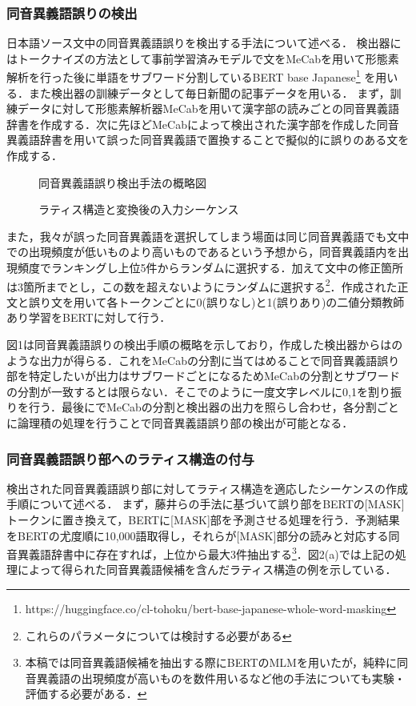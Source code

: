 \documentclass[a4j,10pt, twocolumn]{jarticle} \usepackage[dvipdfmx]{graphicx} \usepackage{amssymb} \usepackage{amsmath}
\begin{document}
\subsubsection{同音異義語誤りの検出}
日本語ソース文中の同音異義語誤りを検出する手法について述べる．
検出器にはトークナイズの方法として事前学習済みモデルで文をMeCabを用いて形態素解析を行った後に単語をサブワード分割しているBERT base Japanese\footnote{https://huggingface.co/cl-tohoku/bert-base-japanese-whole-word-masking}
を用いる．また検出器の訓練データとして毎日新聞の記事データを用いる．
まず，訓練データに対して形態素解析器MeCabを用いて漢字部の読みごとの同音異義語辞書を作成する．次に先ほどMeCabによって検出された漢字部を作成した同音異義語辞書を用いて誤った同音異義語で置換することで擬似的に誤りのある文を作成する．

\begin{figure}[h]
   \centering
    
    \caption{同音異義語誤り検出手法の概略図}
\end{figure}

\begin{figure}[h]
   \centering
    
    \caption{ラティス構造と変換後の入力シーケンス}
\end{figure}

また，我々が誤った同音異義語を選択してしまう場面は同じ同音異義語でも文中での出現頻度が低いものより高いものであるという予想から，同音異義語内を出現頻度でランキングし上位5件からランダムに選択する．加えて文中の修正箇所は3箇所までとし，この数を超えないようにランダムに選択する\footnote{これらのパラメータについては検討する必要がある}．作成された正文と誤り文を用いて各トークンごとに0(誤りなし)と1(誤りあり)の二値分類教師あり学習をBERTに対して行う．

図1は同音異義語誤りの検出手順の概略を示しており，作成した検出器からはのような出力が得らる．これをMeCabの分割に当てはめることで同音異義語誤り部を特定したいが出力はサブワードごとになるためMeCabの分割とサブワードの分割が一致するとは限らない．そこでのように一度文字レベルに0,1を割り振りを行う．最後にでMeCabの分割と検出器の出力を照らし合わせ，各分割ごとに論理積の処理を行うことで同音異義語誤り部の検出が可能となる．

\subsubsection{同音異義語誤り部へのラティス構造の付与}
検出された同音異義語誤り部に対してラティス構造を適応したシーケンスの作成手順について述べる．
まず，藤井ら\cite{Fujii}の手法に基づいて誤り部をBERTの[MASK]トークンに置き換えて，BERTに[MASK]部を予測させる処理を行う．予測結果をBERTの尤度順に10,000語取得し，それらが[MASK]部分の読みと対応する同音異義語辞書中に存在すれば，上位から最大3件抽出する\footnote{本稿では同音異義語候補を抽出する際にBERTのMLMを用いたが，純粋に同音異義語の出現頻度が高いものを数件用いるなど他の手法についても実験・評価する必要がある．}．図2(a)では上記の処理によって得られた同音異義語候補を含んだラティス構造の例を示している．
\end{document}

